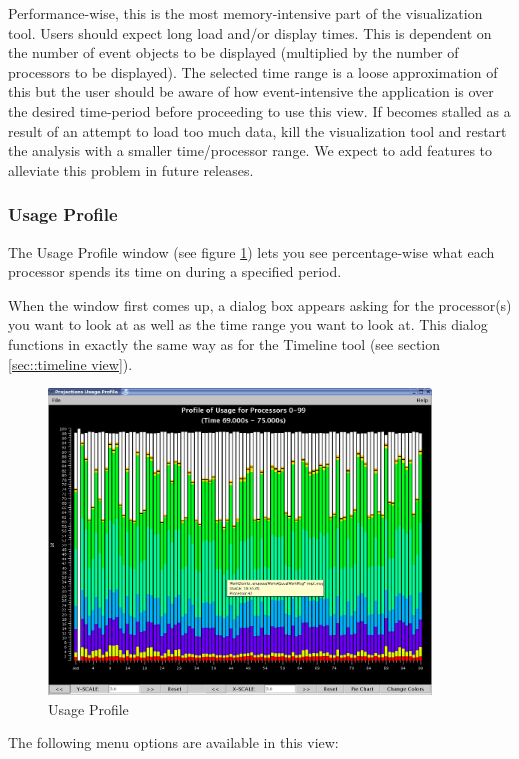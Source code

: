 \documentclass[10pt]{article}
\begin{document}
Performance-wise, this is the most memory-intensive part of the
visualization tool. Users should expect long load and/or display
times. This is dependent on the number of event objects to be
displayed (multiplied by the number of processors to be
displayed). The selected time range is a loose approximation of this
but the user should be aware of how event-intensive the application is
over the desired time-period before proceeding to use this view. If
\projections{} becomes stalled as a result of an attempt to load too
much data, kill the visualization tool and restart the analysis with a
smaller time/processor range. We expect to add features to alleviate
this problem in future releases.

\subsubsection{Usage Profile}

The Usage Profile window (see figure \ref{usage profile}) lets you see
percentage-wise what each processor spends its time on during a
specified period.

When the window first comes up, a dialog box appears asking for the
processor(s) you want to look at as well as the time range you want to
look at.  This dialog functions in exactly the same way as for the Timeline
tool (see section \ref{sec::timeline view}).

\begin{figure}[htb]
\center
\includegraphics[width=4.0in]{fig/usageprofile}
\caption{Usage Profile}
\label{usage profile}
\end{figure}

The following menu options are available in this view:
\end{document}
